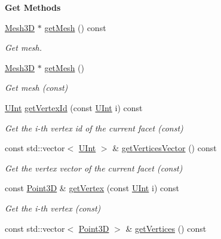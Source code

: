 \begin{Indent}{\bf Get Methods}\par
\begin{DoxyCompactItemize}
\item 
\hyperlink{classFVCode3D_1_1Mesh3D}{Mesh3D} $\ast$ \hyperlink{classFVCode3D_1_1Mesh3D_1_1Facet3D_a95ad0d4c24621fe8fbbf2d251f19d13d}{get\+Mesh} () const 
\begin{DoxyCompactList}\small\item\em Get mesh. \end{DoxyCompactList}\item 
\hyperlink{classFVCode3D_1_1Mesh3D}{Mesh3D} $\ast$ \hyperlink{classFVCode3D_1_1Mesh3D_1_1Facet3D_a54d44d6703fb25c01a0588c6d4181427}{get\+Mesh} ()
\begin{DoxyCompactList}\small\item\em Get mesh (const) \end{DoxyCompactList}\item 
\hyperlink{namespaceFVCode3D_a4bf7e328c75d0fd504050d040ebe9eda}{U\+Int} \hyperlink{classFVCode3D_1_1Mesh3D_1_1Facet3D_a5496550ad89319ec65f2a8a383ac627b}{get\+Vertex\+Id} (const \hyperlink{namespaceFVCode3D_a4bf7e328c75d0fd504050d040ebe9eda}{U\+Int} i) const 
\begin{DoxyCompactList}\small\item\em Get the i-\/th vertex id of the current facet (const) \end{DoxyCompactList}\item 
const std\+::vector$<$ \hyperlink{namespaceFVCode3D_a4bf7e328c75d0fd504050d040ebe9eda}{U\+Int} $>$ \& \hyperlink{classFVCode3D_1_1Mesh3D_1_1Facet3D_aca13a319eb625d203f605634a6131657}{get\+Vertices\+Vector} () const 
\begin{DoxyCompactList}\small\item\em Get the vertex vector of the current facet (const) \end{DoxyCompactList}\item 
const \hyperlink{classFVCode3D_1_1Point3D}{Point3D} \& \hyperlink{classFVCode3D_1_1Mesh3D_1_1Facet3D_a1f6291c27f9cbcb0cbaf276e5c9e5e3c}{get\+Vertex} (const \hyperlink{namespaceFVCode3D_a4bf7e328c75d0fd504050d040ebe9eda}{U\+Int} i) const 
\begin{DoxyCompactList}\small\item\em Get the i-\/th vertex (const) \end{DoxyCompactList}\item 
const std\+::vector$<$ \hyperlink{classFVCode3D_1_1Point3D}{Point3D} $>$ \& \hyperlink{classFVCode3D_1_1Mesh3D_1_1Facet3D_a85547789dc675c1d74ca6353394c85d4}{get\+Vertices} () const 

\end{DoxyCompactItemize}
\end{Indent}

